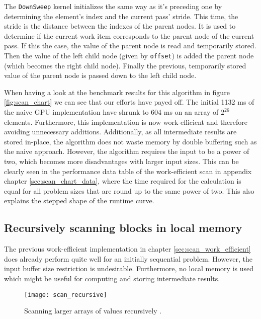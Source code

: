 The \lstinline!DownSweep! kernel initializes the same way as it's preceding one by determining the element's index and the current pass' stride. This time, the stride is the distance between the indexes of the parent nodes. It is used to determine if the current work item corresponds to the parent node of the current pass. If this the case, the value of the parent node is read and temporarily stored. Then the value of the left child node (given by \lstinline!offset!) is added the parent node (which becomes the right child node). Finally the previous, temporarily stored value of the parent node is passed down to the left child node.

When having a look at the benchmark results for this algorithm in figure \ref{fig:scan_chart} we can see that our efforts have payed off. The initial 1132 ms of the naive GPU implementation have shrunk to 604 ms on an array of $2^{26}$ elements. Furthermore, this implementation is now work-efficient and therefore avoiding unnecessary additions. Additionally, as all intermediate results are stored in-place, the algorithm does not waste memory by double buffering such as the naive approach. However, the algorithm requires the input to be a power of two, which becomes more disadvantages with larger input sizes. This can be clearly seen in the performance data table of the work-efficient scan in appendix chapter \ref{sec:scan_chart_data}, where the time required for the calculation is equal for all problem sizes that are round up to the same power of two. This also explains the stepped shape of the runtime curve.

\subsection{Recursively scanning blocks in local memory}
\label{sec:scan_recursive}

The previous work-efficient implementation in chapter \ref{sec:scan_work_efficient} does already perform quite well for an initially sequential problem. However, the input buffer size restriction is undesirable. Furthermore, no local memory is used which might be useful for computing and storing intermediate results.

\begin{figure}
\centering
\texttt{[image: scan\_recursive]}
\caption{Scanning larger arrays of values recursively \cite{gpu_gems_3_chapter_39}.}
\label{fig:scan_recursive}
\end{figure}

